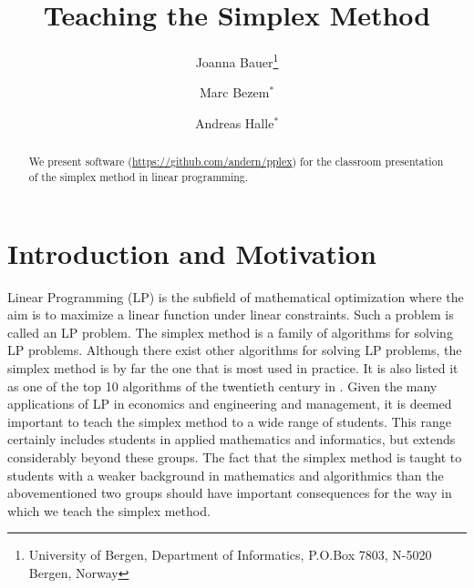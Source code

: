 \documentclass[ukenglish]{nik}
\begin{document}
\title{Teaching the Simplex Method}

\author{
Joanna Bauer\thanks{University of Bergen, Department of Informatics, P.O.Box 7803, N-5020 Bergen, Norway}
\and
Marc Bezem$^*$
\and
Andreas Halle$^*$}


\begin{abstract}
We present software (\url{https://github.com/andern/pplex})
for the classroom presentation of the simplex method in linear programming.
\end{abstract}

\section{Introduction and Motivation}\label{sec:intro}
Linear Programming (LP) is the subfield of mathematical optimization where
the aim is to maximize a linear function under linear constraints. Such a problem
is called an LP problem. The simplex method is a family of algorithms for solving LP problems. 
Although there exist other algorithms for solving LP problems,
the simplex method is by far the one that is most used in practice.
It is also listed it as one of the top 10 algorithms of the twentieth century in
\cite{CiSaE2000}. Given the many applications of LP in economics and engineering and
management, it is deemed important to teach the simplex method to a wide range of
students. This range certainly includes students in applied mathematics and informatics,
but extends considerably beyond these groups. The fact that the simplex method is
taught to students with a weaker background in mathematics and algorithmics than
the abovementioned two groups should have important consequences for the way
in which we teach the simplex method.
\end{document}
